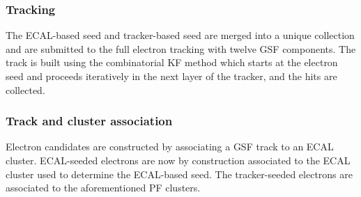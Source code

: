 \subsubsection{Tracking}
The ECAL-based seed and tracker-based seed are merged into a unique collection and are submitted to the full electron tracking with twelve GSF components.
The track is built using the combinatorial KF method which starts at the electron seed and proceeds iteratively in the next layer of the tracker, and the hits are collected.
\subsubsection{Track and cluster association}
Electron candidates are constructed by associating a GSF track to an ECAL cluster. 
ECAL-seeded electrons are now by construction associated to the ECAL cluster used to determine the ECAL-based seed. 
The tracker-seeded electrons are associated to the aforementioned PF clusters. 
  

